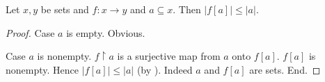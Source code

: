 \documentclass[10pt]{article}
\begin{document}
  \begin{forthel}
    \begin{proposition}
      Let $x, y$ be sets and $f : x \to y$ and $a \subseteq x$.
      Then $|f[a]| \leq |a|$.
    \end{proposition}
    \begin{proof}
      Case $a$ is empty. Obvious.

      Case $a$ is nonempty.
        $f \restriction a$ is a surjective map from $a$ onto $f[a]$.
        $f[a]$ is nonempty.
        Hence $|f[a]| \leq |a|$ (by ).
        Indeed $a$ and $f[a]$ are sets.
      End.
    \end{proof}
  \end{forthel}
\end{document}
